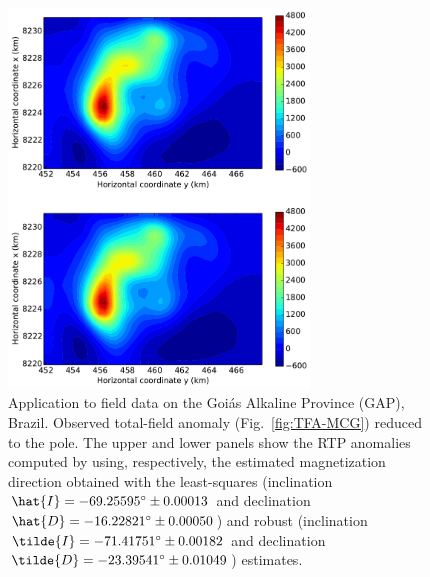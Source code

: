 \documentclass[journal abbreviation, npg]{copernicus}
\begin{document}
\begin{figure}[t]
\includegraphics[width=80mm]{Figures/npgd-2014-0069-f12}
\caption{Application to field data on the Goi\'{a}s Alkaline Province
  (GAP), Brazil. Observed total-field anomaly (Fig.~\ref{fig:TFA-MCG})
  reduced to the pole. The upper and lower panels show the RTP
  anomalies computed by using, respectively, the estimated
  magnetization direction obtained with the least-squares (inclination
  $\hat{I} = -69.25595{\degree} \pm 0.00013${\degree} and declination
  $\hat{D} = -16.22821{\degree} \pm 0.00050${\degree}) and robust
  (inclination $\tilde{I} = -71.41751{\degree} \pm 0.00182${\degree}
  and declination $\tilde{D} = -23.39541{\degree} \pm
  0.01049${\degree}) estimates.}
\label{fig:TFA-MCG-RTP}
\end{figure}
\end{document}

